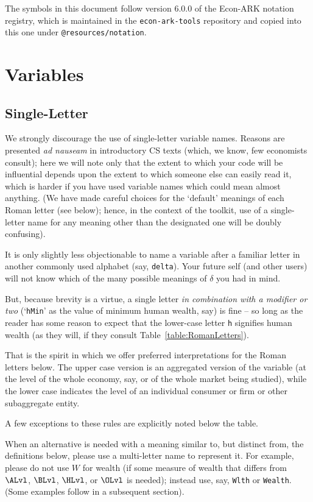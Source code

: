 \documentclass{econark}
\begin{document}
The symbols in this document follow version 6.0.0 of the Econ-ARK notation registry, which is maintained in the \texttt{econ-ark-tools} repository and copied into this one under \texttt{@resources/notation}.


\pagebreak

\section{Variables}

\subsection{Single-Letter}

We strongly discourage the use of single-letter variable names.  Reasons are presented \textit{ad nauseam} in introductory CS texts (which, we know, few economists consult); here we will note only that the extent to which your code will be influential depends upon the extent to which someone else can easily read it, which is harder if you have used variable names which could mean almost anything.  (We have made careful choices for the `default' meanings of each Roman letter (see below); hence, in the context of the toolkit, use of a single-letter name for any meaning other than the designated one will be doubly confusing).

It is only slightly less objectionable to name a variable after a familiar letter in another commonly used alphabet (say, \texttt{delta}).  Your future self (and other users) will not know which of the many possible meanings of $\delta$ you had in mind.

But, because brevity is a virtue, a single letter \textit{in combination with a modifier or two} (`\texttt{hMin}' as the value of minimum human wealth, say) is fine -- so long as the reader has some reason to expect that the lower-case letter \texttt{h} signifies human wealth (as they will, if they consult Table~\ref{table:RomanLetters}).

That is the spirit in which we offer preferred interpretations for the Roman letters below.  The upper case version is an aggregated version of the variable (at the level of the whole economy, say, or of the whole market being studied), while the lower case indicates the level of an individual consumer or firm or other subaggregate entity.

A few exceptions to these rules are explicitly noted below the table.

When an alternative is needed with a meaning similar to, but distinct from, the definitions below, please use a multi-letter name to represent it.  For example, please do not use $W$ for wealth (if some measure of wealth that differs from $\ALvl$, $\BLvl$, $\HLvl$, or $\OLvl$ is needed); instead use, say, \texttt{Wlth} or \texttt{Wealth}.  (Some examples follow in a subsequent section).
\end{document}
